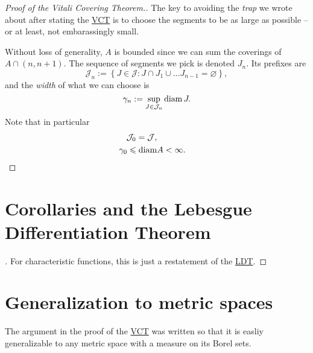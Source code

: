 \begin{proof}[Proof of the Vitali Covering Theorem.]
    The key to avoiding the \emph{trap} we wrote about after stating the \hyperlink{VitaliCoveringTheorem}{VCT} is to choose the segments to be as large as possible -- or at least, not embarassingly small.

    Without loss of generality, \( A \) is bounded since we can sum the coverings of \( A \cap (n,n+1) \). The sequence of segments we pick is denoted \( J_n \). Its prefixes are
    \[ 
        \mathcal{J}_n := \left\{ J \in \mathcal{J}: J \cap J_1 \cup \ldots J_{n-1} = \varnothing \right\}, 
   \]
   and the \emph{width} of what we can choose is
    \[ 
       \gamma_n := \sup_{J \in \mathcal{J}_n} \operatorname{diam} J.  
    \]
    Note that in particular
    \begin{align*}
        \mathcal{J}_0 = \mathcal{J}, \\
        \gamma_0 \leqslant \operatorname{diam} &A < \infty.
    \end{align*}
\end{proof}

\section{Corollaries and the Lebesgue Differentiation Theorem}


\begin{proof}[]
    For characteristic functions, this is just a restatement of the \hyperlink{LebesgueDensityTheorem}{LDT}.
\end{proof}

\section{Generalization to metric spaces}

The argument in the proof of the \hyperlink{VitaliCoveringTheorem}{VCT} was written so that it is easliy generalizable to any metric space with a measure on its Borel sets. 

